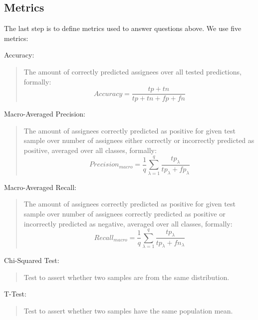 \subsection{Metrics}

The last step is to define metrics used to answer questions above. We use five metrics:

\begin{framed}
  Accuracy:
  \begin{quote}
    The amount of correctly predicted assignees over all tested predictions, formally:
    $$Accuracy = \frac{tp+tn}{tp+tn+fp+fn}$$
  \end{quote}

  Macro-Averaged Precision:
  \begin{quote}
    The amount of assignees correctly predicted as positive for given test sample over number of assignees either correctly or incorrectly predicted as positive, averaged over all classes\cite{Asch2013}, formally:
    $$Precision_{macro} = \frac{1}{q}\sum_{\lambda=1}^q\frac{tp_{\lambda}}{tp_{\lambda}+fp_{\lambda}}$$
  \end{quote}

  Macro-Averaged Recall:
  \begin{quote}
    The amount of assignees correctly predicted as positive for given test sample over number of assignees correctly predicted as positive or incorrectly predicted as negative, averaged over all classes\cite{Asch2013}, formally:
    $$Recall_{macro} = \frac{1}{q}\sum_{\lambda=1}^q\frac{tp_{\lambda}}{tp_{\lambda}+fn_{\lambda}}$$ 
  \end{quote}

  Chi-Squared Test:
  \begin{quote}
    Test to assert whether two samples are from the same distribution.
  \end{quote}

  T-Test:
  \begin{quote}
    Test to assert whether two samples have the same population mean.
  \end{quote}
\end{framed}